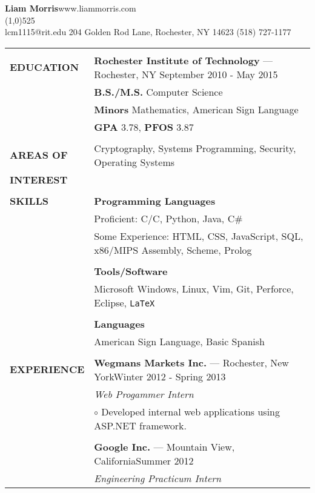 \documentclass[11pt,letterpaper]{article}
\newcommand{\CPP}
{C\nolinebreak[4]\hspace{-.05em}\raisebox{.22ex}{\footnotesize\bf ++}}
\begin{document}
\raggedright

\textbf{\huge{Liam Morris}}\hfill www.liammorris.com\\
\vspace{-8pt}
\line(1,0){525}\\
lcm1115@rit.edu \hfill 204 Golden Rod Lane, Rochester, NY 14623 \hfill (518)
727-1177\\
\vspace{5pt}

\begin{tabular}{@{}lp{6.2in}}
&\\
\textbf{EDUCATION}
&\textbf{Rochester Institute of Technology} --- Rochester, NY \hfill September 2010 - May 2015\\
&\textbf{B.S./M.S.} Computer Science\\
&\textbf{Minors} Mathematics, American Sign Language\\
&\textbf{GPA} 3.78, \textbf{PFOS} 3.87\\
&\\
\textbf{AREAS OF}
&Cryptography, Systems Programming, Security, Operating Systems\\
\textbf{INTEREST}&\\
&\\
\textbf{SKILLS}
&\textbf{Programming Languages}\\
&Proficient: C/\CPP, Python, Java, C\#\\
&Some Experience: HTML, CSS, JavaScript, SQL, x86/MIPS Assembly, Scheme, Prolog\\
&\\
&\textbf{Tools/Software}\\
&Microsoft Windows, Linux, Vim, Git, Perforce, Eclipse, \texttt{\LaTeX}\\
&\\
&\textbf{Languages}\\
&American Sign Language, Basic Spanish\\
&\\
\textbf{EXPERIENCE}
&\textbf{Wegmans Markets Inc.} --- Rochester, New York\hfill Winter 2012 - Spring 2013\\
&\emph{Web Progammer Intern}\\
&\hspace{10pt}$\circ$ Developed internal web applications using ASP.NET framework.\\
&\\
&\textbf{Google Inc.} --- Mountain View, California\hfill Summer 2012\\
&\emph{Engineering Practicum Intern}\\

\end{tabular}
\end{document}
